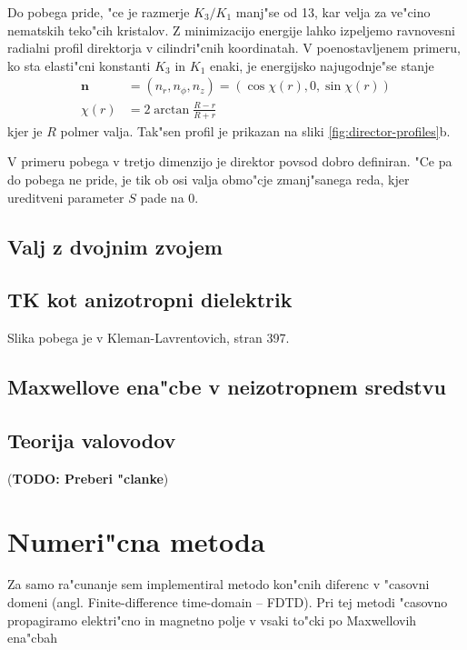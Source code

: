 \documentclass[a4paper,10pt]{article}
\newcommand{\todo}[1]{(\textbf{\textsc{TODO}: #1})}
\renewcommand{\vec}{\mathbf}
\begin{document}
Do pobega pride, "ce je razmerje $K_3/K_1$ manj"se od 13, kar velja za ve"cino nematskih teko"cih kristalov. Z minimizacijo energije lahko izpeljemo ravnovesni radialni profil direktorja v cilindri"cnih koordinatah. V poenostavljenem primeru, ko sta elasti"cni konstanti $K_3$ in $K_1$ enaki, je energijsko najugodnje"se stanje\cite{kleman} 
\begin{align}
 \vec n &= (n_r, n_\phi, n_z) = (\cos \chi(r), 0, \sin \chi(r)) \\
 \chi(r) &= 2 \arctan \frac{R-r}{R+r}
\end{align}
kjer je $R$ polmer valja. Tak"sen profil je prikazan na sliki \ref{fig:director-profiles}b. 

V primeru pobega v tretjo dimenzijo je direktor povsod dobro definiran. "Ce pa do pobega ne pride, je tik ob osi valja obmo"cje zmanj"sanega reda, kjer ureditveni parameter $S$ pade na 0. 

\subsection{Valj z dvojnim zvojem}




\subsection{TK kot anizotropni dielektrik}

Slika pobega je v Kleman-Lavrentovich, stran 397. 

\subsection{Maxwellove ena"cbe v neizotropnem sredstvu}

\subsection{Teorija valovodov}
\todo{Preberi "clanke}

\section{Numeri"cna metoda}

Za samo ra"cunanje sem implementiral metodo kon"cnih diferenc v "casovni domeni (angl. Finite-difference time-domain -- FDTD). 
Pri tej metodi "casovno propagiramo elektri"cno in magnetno polje v vsaki to"cki po Maxwellovih ena"cbah
\end{document}
